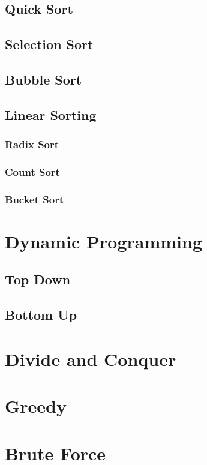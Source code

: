 \documentclass[12pt]{article}
\begin{document}
\subsection{Quick Sort}
\subsection{Selection Sort}
\subsection{Bubble Sort}

\subsection{Linear Sorting}
\subsubsection{Radix Sort}
\subsubsection{Count Sort}
\subsubsection{Bucket Sort}
\section{Dynamic Programming}
\subsection{Top Down}
\subsection{Bottom Up}

\section{Divide and Conquer}

\section{Greedy}

\section{Brute Force}
\end{document}
